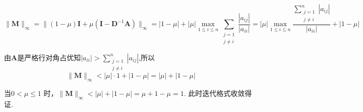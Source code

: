 \begin{tcolorbox}
$$\|\boldsymbol{M}\|_{\infty}=\|(1-\mu) \boldsymbol{I}+\mu( \boldsymbol{I}-\boldsymbol{D}^{-1}\boldsymbol{A})\|_{\infty} =|1-\mu|+|\mu| \max _{1 \leqslant i \leqslant n} \sum_{\substack{j=1 \\ j \neq i}} \frac{\left|a_{i j}\right|}{\left|a_{i i}\right|}=|\mu|\max _{1 \leqslant i \leqslant n} \frac{\sum\limits_{\substack{j=1 \\ j \neq i}}^{n}\left|a_{i j}\right|}{\left|a_{i i}\right|}+|1-\mu|$$

由$\boldsymbol{A}$是严格行对角占优知$|a_{i i}|>\sum\limits_{\substack{j=1 \\ j \neq i}}^{n}\left|a_{i j}\right|$,所以
$$\|\boldsymbol{M}\|_{\infty}<|\mu|\cdot1+|1-\mu|=|\mu|+|1-\mu|$$

当$ 0<\mu \leq 1 $ 时，$\|\boldsymbol{M}\|_{\infty}<|\mu|+|1-\mu|=\mu+1-\mu=1$.
 此时迭代格式收敛得证.
\end{tcolorbox}





















